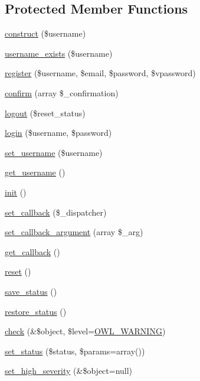 \subsection*{Protected Member Functions}
\begin{DoxyCompactItemize}
\item 
\hyperlink{classUserHandler_ae471fe5473119da7089886c27ad5a3e9}{construct} (\$username)
\item 
\hyperlink{classUserHandler_a4b50cc703608c490080b25c5b2ae3418}{username\_\-exists} (\$username)
\item 
\hyperlink{classUserHandler_a7fbe37f478bf35e0570db3296529e2a4}{register} (\$username, \$email, \$password, \$vpassword)
\item 
\hyperlink{classUserHandler_a33b6532ffa6ac263b195bb58c2d770dd}{confirm} (array \$\_\-confirmation)
\item 
\hyperlink{classUserHandler_a0bcf46a5b0c4a5b495cba98b8da02b7b}{logout} (\$reset\_\-status)
\item 
\hyperlink{classUserHandler_abf6562660ee8ec1663afe08550a63643}{login} (\$username, \$password)
\item 
\hyperlink{classUserHandler_afbcc9a275b547cca0bd4cff567b054a0}{set\_\-username} (\$username)
\item 
\hyperlink{classUserHandler_a76e8c8b88c8d92f2d03645e810b9253c}{get\_\-username} ()
\item 
\hyperlink{class__OWL_ae0ef3ded56e8a6b34b6461e5a721cd3e}{init} ()
\item 
\hyperlink{class__OWL_a28d9025eaf37b49d63cb334ed28c33f0}{set\_\-callback} (\$\_\-dispatcher)
\item 
\hyperlink{class__OWL_a1e26611ce858b237f5a98a91ea3c3a1b}{set\_\-callback\_\-argument} (array \$\_\-arg)
\item 
\hyperlink{class__OWL_abded13b1c97ea6e0cfe3c68cb6bcf7a5}{get\_\-callback} ()
\item 
\hyperlink{class__OWL_a2f2a042bcf31965194c03033df0edc9b}{reset} ()
\item 
\hyperlink{class__OWL_a9e49b9c76fbc021b244c6915ea536d71}{save\_\-status} ()
\item 
\hyperlink{class__OWL_a465eeaf40edd9f9c848841700c32ce55}{restore\_\-status} ()
\item 
\hyperlink{class__OWL_ae2e3c56e5f3c4ce4156c6b1bb1c50f63}{check} (\&\$object, \$level=\hyperlink{owl_8severitycodes_8php_ace886152e2e86cd2e91cb833fd495adb}{OWL\_\-WARNING})
\item 
\hyperlink{class__OWL_aea912d0ede9b3c2a69b79072d94d4787}{set\_\-status} (\$status, \$params=array())
\item 
\hyperlink{class__OWL_a576829692a3b66e3d518853bf43abae3}{set\_\-high\_\-severity} (\&\$object=null)
\end{DoxyCompactItemize}

